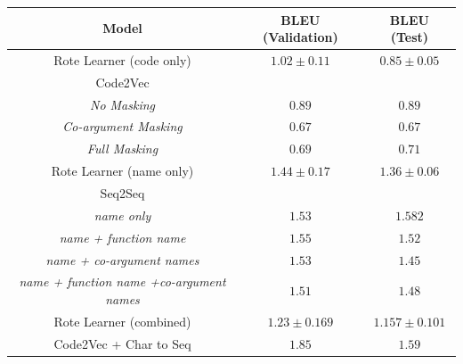 \begin{table}[!ht]
\begin{center}
\begin{tabular}{ c | c | c }
    Model                             & BLEU (Validation) & BLEU (Test) \\
    \hline
    Rote Learner  (code only)         & $ 1.02 \pm  0.11 $ & $ 0.85 \pm 0.05 $ \\
    \hline

    Code2Vec                          &   & \\
    \textit{No Masking}                         & $ 0.89 $ & $ 0.89 $ \\
    \textit{Co-argument Masking}             & $ 0.67 $ & $ 0.67 $ \\
    \textit{Full Masking}            & $ 0.69 $ & $ 0.71 $ \\
    \hline
    \hline
    Rote Learner  (name only)         & $ 1.44 \pm  0.17 $ & $ 1.36 \pm 0.06$ \\
    \hline
    Seq2Seq                             & &   \\
    \textit{name only}              & $ 1.53 $ & $ 1.582$ \\
    \textit{name + function name}      & $ 1.55 $ & $ 1.52 $ \\
    \textit{name + co-argument names}         & $ 1.53 $ & $ 1.45$ \\   
    \textit{name + function name +co-argument names}     & $ 1.51 $ & $ 1.48$ \\
    \hline
    \hline
    Rote Learner (combined)            & $ 1.23 \pm  0.169 $ & $ 1.157 \pm 0.101 $ \\
    Code2Vec  + Char to Seq            & $ 1.85 $ & $ 1.59 $ \\
    \hline

\end{tabular}
\end{center}
\end{table}

